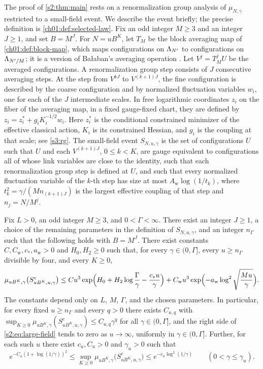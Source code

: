 The proof of \cref{s2:thm:main} rests on a renormalization group analysis of $\mu_{N,\gamma}$ restricted to a small-field event. We describe the event briefly; the precise definition is \cref{ch01:def:selected-law}. Fix an odd integer $M\ge3$ and an integer $J\ge1$, and set $B=M^J$. For $N=uB^K$, let $T_M$ be the block averaging map of \cref{ch01:def:block-map}, which maps configurations on $\Lambda_{N'}$ to configurations on $\Lambda_{N'/M}$; it is a version of Bałaban's averaging operation \cite{Balaban1985Averaging}. Let $V^{j}=T_M^jU$ be the averaged configurations. A renormalization group step consists of $J$ consecutive averaging steps. At the step from $V^{kJ}$ to $V^{(k+1)J}$, the fine configuration is described by the coarse configuration and by normalized fluctuation variables $w_i$, one for each of the $J$ intermediate scales. In free logarithmic coordinates $z_i$ on the fiber of the averaging map, in a fixed gauge-fixed chart, they are defined by $z_i=z_i^*+g_iK_i^{-1/2}w_i$. Here $z_i^*$ is the conditional constrained minimizer of the effective classical action, $K_i$ is its constrained Hessian, and $g_i$ is the coupling at that scale; see \cref{s3:rg}. The small-field event $S_{N,u,\gamma}$ is the set of configurations $U$ such that $U$ and each $V^{(k+1)J}$, $0\le k<K$, are gauge equivalent to configurations all of whose link variables are close to the identity, such that each renormalization group step is defined at $U$, and such that every normalized fluctuation variable of the $k$-th step has size at most $A_{\mathrm w}\log(1/t_k)$, where $t_k^2=\gamma/(Mn_{(k+1)J})$ is the largest effective coupling of that step and $n_j=N/M^j$.

\begin{theorem}\label{s2:thm:large-field}
Fix $L>0$, an odd integer $M\ge3$, and $0<\Gamma<\infty$. There exist an integer $J\ge1$, a choice of the remaining parameters in the definition of $S_{N,u,\gamma}$, and an integer $n_\Gamma$ such that the following holds with $B=M^J$. There exist constants $C,C_{\mathrm w},c_*,a_{\mathrm w}>0$ and $H_0,H_2\ge0$ such that, for every $\gamma\in(0,\Gamma]$, every $u\ge n_\Gamma$ divisible by four, and every $K\ge0$,
\begin{equation}\label{s2:eq:large-field}
 \mu_{uB^K,\gamma}\bigl(S_{uB^K,u,\gamma}^c\bigr)
 \le Cu^3\exp\Bigl(H_0+H_2\log\frac{\Gamma}{\gamma}-\frac{c_*u}{\gamma}\Bigr)
 +C_{\mathrm w}u^3\exp\Bigl(-a_{\mathrm w}\log^2\sqrt{\frac{Mu}{\gamma}}\Bigr).
\end{equation}
The constants depend only on $L$, $M$, $\Gamma$, and the chosen parameters. In particular, for every fixed $u\ge n_\Gamma$ and every $q>0$ there exists $C_{u,q}$ with $\sup_{K\ge0}\mu_{uB^K,\gamma}(S_{uB^K,u,\gamma}^c)\le C_{u,q}\gamma^q$ for all $\gamma\in(0,\Gamma]$, and the right side of \eqref{s2:eq:large-field} tends to zero as $u\to\infty$, uniformly in $\gamma\in(0,\Gamma]$. Further, for each such $u$ there exist $c_u,C_u>0$ and $\gamma_u>0$ such that
\[
 e^{-C_u(1+\log(1/\gamma))^2}\le\sup_{K\ge0}\mu_{uB^K,\gamma}\bigl(S_{uB^K,u,\gamma}^c\bigr)\le e^{-c_u\log^2(1/\gamma)}\qquad(0<\gamma\le\gamma_u).
\]
\end{theorem}

